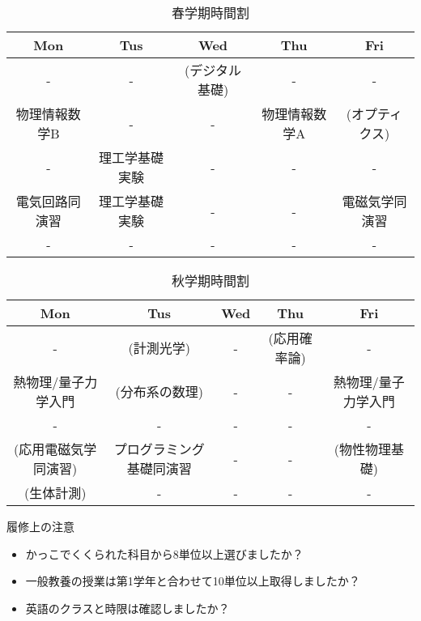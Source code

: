 \documentclass{ltjsarticle}
\begin{document}
  \begin{table}[htbp]
    \caption{春学期時間割}
    \centering
    \begin{tabular}{c|c|c|c|c}
      Mon & Tus & Wed & Thu & Fri \\ \hline\hline
      - & - & (デジタル基礎) & - & - \\ \hline
      物理情報数学B & - & - & 物理情報数学A & (オプティクス) \\ \hline
      - & 理工学基礎実験   & - & - & - \\ \hline
      電気回路同演習 & 理工学基礎実験 & - & - & 電磁気学同演習 \\ \hline
      - & - & - & - & - \\
    \end{tabular}
  \end{table}
  \begin{table}[htbp]
    \caption{秋学期時間割}
    \centering
    \begin{tabular}{c|c|c|c|c}
      Mon & Tus & Wed & Thu & Fri \\ \hline\hline
      - & (計測光学) & - & (応用確率論) & - \\ \hline
      熱物理/量子力学入門& (分布系の数理) & - & - & 熱物理/量子力学入門 \\ \hline
      - &- & - & - & - \\ \hline
      (応用電磁気学同演習)& プログラミング基礎同演習 & - & - & (物性物理基礎)\\ \hline
      (生体計測)& - & - & - & - \\
    \end{tabular}
  \end{table}
  履修上の注意
  \begin{itemize}
    \item かっこでくくられた科目から8単位以上選びましたか？
    \item 一般教養の授業は第1学年と合わせて10単位以上取得しましたか？
    \item 英語のクラスと時限は確認しましたか？
  \end{itemize}
\end{document}
